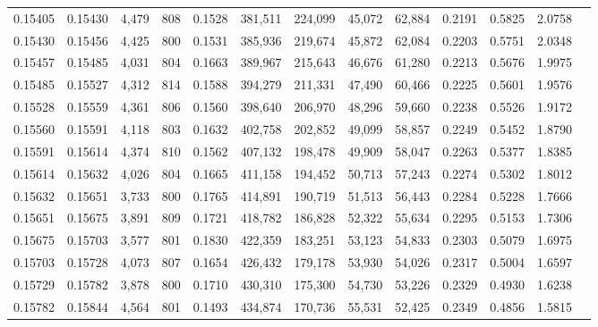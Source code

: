 \begin{tabular}{rrrrrrrrrrrrr}
0.15405 & 0.15430 &  4,479 & 808 &                                     0.1528 & 381,511 & 224,099 &  45,072 &  62,884 & 0.2191 & 0.5825 & 2.0758 \\
0.15430 & 0.15456 &  4,425 & 800 &                                     0.1531 & 385,936 & 219,674 &  45,872 &  62,084 & 0.2203 & 0.5751 & 2.0348 \\
0.15457 & 0.15485 &  4,031 & 804 &                                     0.1663 & 389,967 & 215,643 &  46,676 &  61,280 & 0.2213 & 0.5676 & 1.9975 \\
0.15485 & 0.15527 &  4,312 & 814 &                                     0.1588 & 394,279 & 211,331 &  47,490 &  60,466 & 0.2225 & 0.5601 & 1.9576 \\
0.15528 & 0.15559 &  4,361 & 806 &                                     0.1560 & 398,640 & 206,970 &  48,296 &  59,660 & 0.2238 & 0.5526 & 1.9172 \\
0.15560 & 0.15591 &  4,118 & 803 &                                     0.1632 & 402,758 & 202,852 &  49,099 &  58,857 & 0.2249 & 0.5452 & 1.8790 \\
0.15591 & 0.15614 &  4,374 & 810 &                                     0.1562 & 407,132 & 198,478 &  49,909 &  58,047 & 0.2263 & 0.5377 & 1.8385 \\
0.15614 & 0.15632 &  4,026 & 804 &                                     0.1665 & 411,158 & 194,452 &  50,713 &  57,243 & 0.2274 & 0.5302 & 1.8012 \\
0.15632 & 0.15651 &  3,733 & 800 &                                     0.1765 & 414,891 & 190,719 &  51,513 &  56,443 & 0.2284 & 0.5228 & 1.7666 \\
0.15651 & 0.15675 &  3,891 & 809 &                                     0.1721 & 418,782 & 186,828 &  52,322 &  55,634 & 0.2295 & 0.5153 & 1.7306 \\
0.15675 & 0.15703 &  3,577 & 801 &                                     0.1830 & 422,359 & 183,251 &  53,123 &  54,833 & 0.2303 & 0.5079 & 1.6975 \\
0.15703 & 0.15728 &  4,073 & 807 &                                     0.1654 & 426,432 & 179,178 &  53,930 &  54,026 & 0.2317 & 0.5004 & 1.6597 \\
0.15729 & 0.15782 &  3,878 & 800 &                                     0.1710 & 430,310 & 175,300 &  54,730 &  53,226 & 0.2329 & 0.4930 & 1.6238 \\
0.15782 & 0.15844 &  4,564 & 801 &                                     0.1493 & 434,874 & 170,736 &  55,531 &  52,425 & 0.2349 & 0.4856 & 1.5815 \\

\end{tabular}
